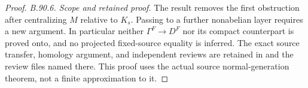 \begin{proof}
\emph{B.90.6. Scope and retained proof.}
The result removes the first obstruction after centralizing $M$
relative to $K_s$. Passing to a further nonabelian layer requires
a new argument. In particular neither
$\Gamma^F\to D^F$ nor its compact counterpart is proved onto,
and no projected fixed-source equality is inferred.
The exact source transfer, homology argument, and independent
reviews are retained in
 and the
review files named there. This proof uses the actual source
normal-generation theorem, not a finite approximation to it.
\end{proof}

